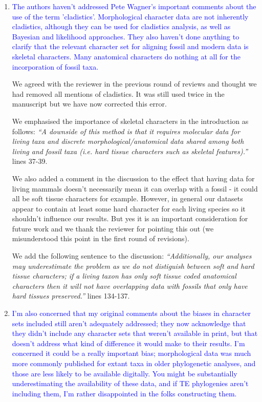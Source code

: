 \documentclass[12pt,letterpaper]{article}
\begin{document}
\begin{enumerate}
\item{\textcolor{blue}{The authors haven't addressed Pete Wagner's important comments about the use of the term 'cladistics'. Morphological character data are not inherently cladistics, although they can be used for cladistics analysis, as well as Bayesian and likelihood approaches. They also haven't done anything to clarify that the relevant character set for aligning fossil and modern data is skeletal characters. Many anatomical characters do nothing at all for the incorporation of fossil taxa.}}

We agreed with the reviewer in the previous round of reviews and thought we had removed all mentions of cladistics. It was still used twice in the manuscript but we have now corrected this error.

We emphasised the importance of skeletal characters in the introduction as follows:
\textit{``A downside of this method is that it requires molecular data for living taxa and discrete morphological/anatomical data shared among both living and fossil taxa (i.e. hard tissue characters such as skeletal features).''} lines 37-39.

We also added a comment in the discussion to the effect that having data for living mammals doesn't necessarily mean it can overlap with a fossil - it could all be soft tissue characters for example. However, in general our datasets appear to contain at least some hard character for each living species so it shouldn't influence our results. But yes it is an important consideration for future work and we thank the reviewer for pointing this out (we misunderstood this point in the first round of revisions). 

We add the following sentence to the discussion:
\textit{``Additionally, our analyses may underestimate the problem as we do not distiguish between soft and hard tissue characters; if a living taxon has only soft tissue coded anatomical characters then it will not have overlapping data with fossils that only have hard tissues preserved.''} lines 134-137.
\item{\textcolor{blue}{I'm also concerned that my original comments about the biases in character sets included still aren't adequately addressed; they now acknowledge that they didn't include any character sets that weren't available in print, but that doesn't address what kind of difference it would make to their results. I'm concerned it could be a really important bias; morphological data was much more commonly published for extant taxa in older phylogenetic analyses, and those are less likely to be available digitally. You might be substantially underestimating the availability of these data, and if TE phylogenies aren't including them, I'm rather disappointed in the folks constructing them. }}


\end{enumerate}
\end{document}
